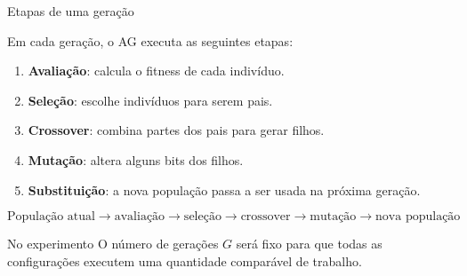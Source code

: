 \documentclass[aspectratio=169,11pt]{beamer}
\begin{document}
\begin{frame}{Etapas de uma geração}

    \vspace{0.15cm}

    Em cada geração, o AG executa as seguintes etapas:

    \vspace{0.15cm}

    \begin{enumerate}
        \item \textbf{Avaliação}: calcula o fitness de cada indivíduo.
        \item \textbf{Seleção}: escolhe indivíduos para serem pais.
        \item \textbf{Crossover}: combina partes dos pais para gerar filhos.
        \item \textbf{Mutação}: altera alguns bits dos filhos.
        \item \textbf{Substituição}: a nova população passa a ser usada na próxima geração.
    \end{enumerate}

    \vspace{0.20cm}

    \[
        \text{População atual}
        \rightarrow
        \text{avaliação}
        \rightarrow
        \text{seleção}
        \rightarrow
        \text{crossover}
        \rightarrow
        \text{mutação}
        \rightarrow
        \text{nova população}
    \]

    \begin{impactbox}{No experimento}
        O número de gerações $G$ será fixo para que todas as configurações
        executem uma quantidade comparável de trabalho.
    \end{impactbox}

\end{frame}

\end{document}
